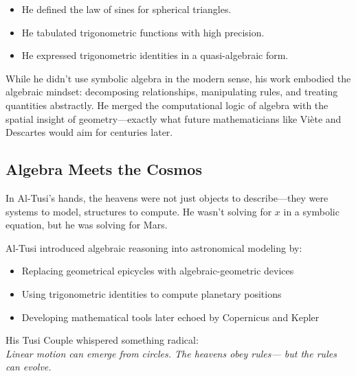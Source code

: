 \begin{itemize}
  \item He defined the law of sines for spherical triangles.
  \item He tabulated trigonometric functions with high precision.
  \item He expressed trigonometric identities in a quasi-algebraic form.
\end{itemize}

While he didn’t use symbolic algebra in the modern sense, his work embodied the algebraic mindset: decomposing relationships, manipulating rules, and treating quantities abstractly. He merged the computational logic of algebra with the spatial insight of geometry—exactly what future mathematicians like Viète and Descartes would aim for centuries later.

\subsection{Algebra Meets the Cosmos}

In Al-Tusi’s hands, the heavens were not just objects to describe—they were systems to model, structures to compute. He wasn’t solving for \( x \) in a symbolic equation, but he was solving for Mars.

\begin{tcolorbox}[colback=blue!5!white, colframe=blue!50!black, title={Al-Tusi’s Astronomical Legacy}]
Al-Tusi introduced algebraic reasoning into astronomical modeling by:

\begin{itemize}
  \item Replacing geometrical epicycles with algebraic-geometric devices
  \item Using trigonometric identities to compute planetary positions
  \item Developing mathematical tools later echoed by Copernicus and Kepler
\end{itemize}

His Tusi Couple whispered something radical:
\\[0.5em]
\textit{Linear motion can emerge from circles.  
The heavens obey rules—  
but the rules can evolve.}
\end{tcolorbox}
